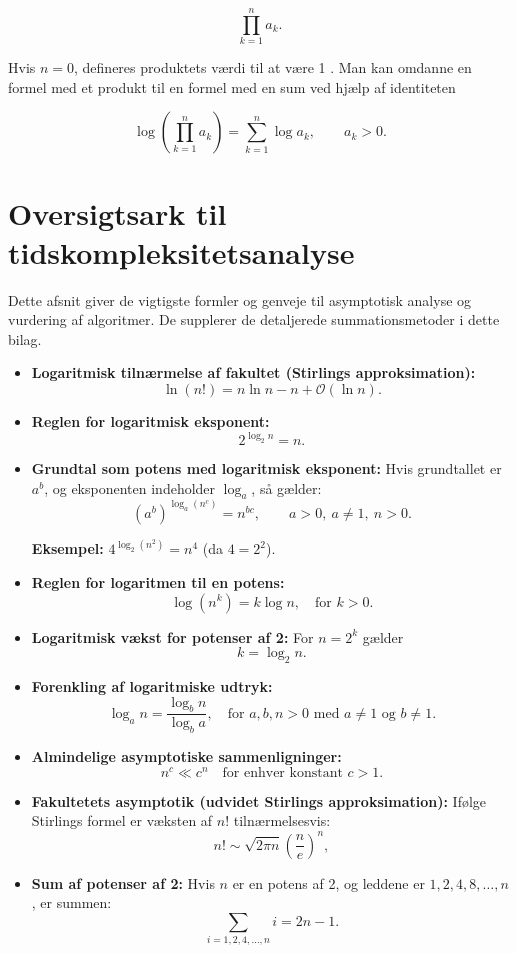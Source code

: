 \[
\prod_{k=1}^n a_k .
\]


Hvis $n=0$, defineres produktets værdi til at være 1 . Man kan omdanne en formel med et produkt til en formel med en sum ved hjælp af identiteten

\[
\log \left(\prod_{k=1}^n a_k\right)=\sum_{k=1}^n \log a_k, \qquad a_k>0.
\]

\section*{Oversigtsark til tidskompleksitetsanalyse}

Dette afsnit giver de vigtigste formler og genveje til asymptotisk analyse og vurdering af algoritmer. De supplerer de detaljerede summationsmetoder i dette bilag.

\begin{itemize}
    \item \textbf{Logaritmisk tilnærmelse af fakultet (Stirlings approksimation):} 
    \[
    \ln(n!) = n\ln n-n+\mathcal{O}(\ln n).
    \]
 
    \item \textbf{Reglen for logaritmisk eksponent:} 
    \[
    2^{\log_2 n} = n.
    \]

    \item \textbf{Grundtal som potens med logaritmisk eksponent:} 
    Hvis grundtallet er \( a^b \), og eksponenten indeholder \( \log_a \), så gælder:
    \[
    (a^b)^{\log_a(n^c)} = n^{bc}, \qquad a>0,\ a\neq1,\ n>0.
    \]
    
    \textbf{Eksempel:} \( 4^{\log_2(n^2)} = n^4 \) (da \( 4 = 2^2 \)).
    
    \item \textbf{Reglen for logaritmen til en potens:} 
    \[
    \log(n^k) = k \log n, \quad \text{for } k > 0.
    \]
    
    \item \textbf{Logaritmisk vækst for potenser af 2:} 
    For \( n = 2^k \) gælder
    \[
    k = \log_2 n.
    \]
    
    \item \textbf{Forenkling af logaritmiske udtryk:} 
    \[
    \log_a n = \frac{\log_b n}{\log_b a}, \quad \text{for } a,b,n>0 \text{ med } a\neq1 \text{ og } b\neq1.
    \]
    
    \item \textbf{Almindelige asymptotiske sammenligninger:} 
    \[
    n^c \ll c^n \quad \text{for enhver konstant } c > 1.
    \]
    
    \item \textbf{Fakultetets asymptotik (udvidet Stirlings approksimation):} 
    Ifølge Stirlings formel er væksten af \( n! \) tilnærmelsesvis:
    \[
    n! \sim \sqrt{2\pi n}\left(\frac{n}{e}\right)^n,
    \]
    
    \item \textbf{Sum af potenser af 2:} 
    Hvis $n$ er en potens af 2, og leddene er \(1,2,4,8,\ldots,n\), er summen:
    \[
    \sum_{i=1,2,4,\ldots,n} i = 2n - 1.
    \]

\end{itemize}
